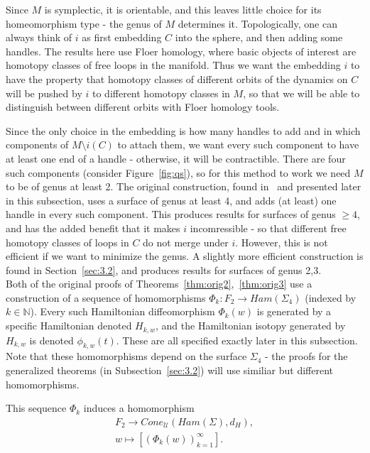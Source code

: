 \documentclass[11pt]{article}
\newenvironment{myequation}
    {
        \begin{equation*}
        \begin{gathered}
    }
    { 
        \end{gathered} 
        \end{equation*}
    }
\newcommand{\N}{\mathbb{N}}
\begin{document}
            Since $M$ is symplectic, it is orientable, and this leaves little choice for its homeomorphism type - the genus of $M$ determines it. Topologically, one can always think of $i$ as first embedding $C$ into the sphere, and then adding some handles. The results here use Floer homology, where basic objects of interest are homotopy classes of free loops in the manifold. Thus we want the embedding $i$ to have the property that homotopy classes of different orbits of the dynamics on $C$ will be pushed by $i$ to different homotopy classes in $M$, so that we will be able to distinguish between different orbits with Floer homology tools.
            
            Since the only choice in the embedding is how many handles to add and in which components of $M \setminus i(C)$ to attach them, we want every such component to have at least one end of a handle - otherwise, it will be contractible. There are four such components (consider Figure~\ref{fig:qs}), so for this method to work we need $M$ to be of genus at least 2. The original construction, found in~\cite{PS14} and presented later in this subsection, uses a surface of genus at least 4, and adds (at least) one handle in every such component. This produces results for surfaces of genus $\geq 4$, and has the added benefit that it makes $i$ incomressible - so that different free homotopy classes of loops in $C$ do not merge under $i$. However, this is not efficient if we want to minimize the genus. A slightly more efficient construction is found in Section~\ref{sec:3.2}, and produces results for surfaces of genus 2,3. \\
            
    
            
            Both of the original proofs of Theorems~\ref{thm:orig2},~\ref{thm:orig3} use a construction of a sequence of homomorphisms $\Phi_k: F_2 \to Ham(\Sigma_4)$ (indexed by $k \in \N$). Every such Hamiltonian diffeomorphism $\Phi_k(w)$ is generated by a specific Hamiltonian denoted $H_{k,w}$, and the Hamiltonian isotopy generated by $H_{k,w}$ is denoted $\phi_{k,w}(t)$. These are all specified exactly later in this subsection. Note that these homomorphisms depend on the surface $\Sigma_4$ - the proofs for the generalized theorems (in Subsection~\ref{sec:3.2}) will use similiar but different homomorphisms.
            
            This sequence $\Phi_k$ induces a homomorphism
            \begin{myequation}
                F_2 \to Cone_\mathcal{U}(Ham(\Sigma), d_H) , \\
                w \mapsto [(\Phi_k(w))_{k=1}^\infty] .
            \end{myequation}
            
\end{document}
